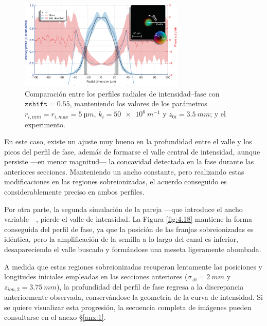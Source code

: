 \begin{figure}[htbp]
  \centering
  \includegraphics[width=0.7\textwidth]{Figuras/ch4_cmp31.png}
  \caption{Comparación entre los perfiles radiales de intensidad--fase con $\texttt{zshift}=0.55$, manteniendo los valores de los parámetros $r_{i,min}=r_{i,max}=\qty{5}{µm}$, $k_{i}=\qty{50e6}{m^{-1}}$ y $z_{0i}=\qty{3.5}{mm}$; y el experimento.}
  \label{fig:4.17}
\end{figure}

En este caso, existe un ajuste muy bueno en la profundidad entre el valle y los picos del perfil de fase, además de formarse el valle central de intensidad, aunque persiste ---en menor magnitud--- la concavidad detectada en la fase durante las anteriores secciones. Manteniendo un ancho constante, pero realizando estas modificaciones en las regiones sobreionizadas, el acuerdo conseguido es considerablemente preciso en ambos perfiles.

Por otra parte, la segunda simulación de la pareja ---que introduce el ancho variable---, pierde el valle de intensidad. La Figura \ref{fig:4.18} mantiene la forma conseguida del perfil de fase, ya que la posición de las franjas sobreionizadas es idéntica, pero la amplificación de la semilla a lo largo del canal es inferior, desapareciendo el valle buscado y formándose una meseta ligeramente abombada.

A medida que estas regiones sobreionizadas recuperan lentamente las posiciones y longitudes iniciales empleadas en las secciones anteriores ($\sigma_{z0}=\qty{2}{mm}$ y $z_{ion,2}=\qty{3.75}{mm}$), la profundidad del perfil de fase regresa a la discrepancia anteriormente observada, conservándose la geometría de la curva de intensidad. Si se quiere visualizar esta progresión, la secuencia completa de imágenes pueden consultarse en el anexo \S\ref{anx:1}.

